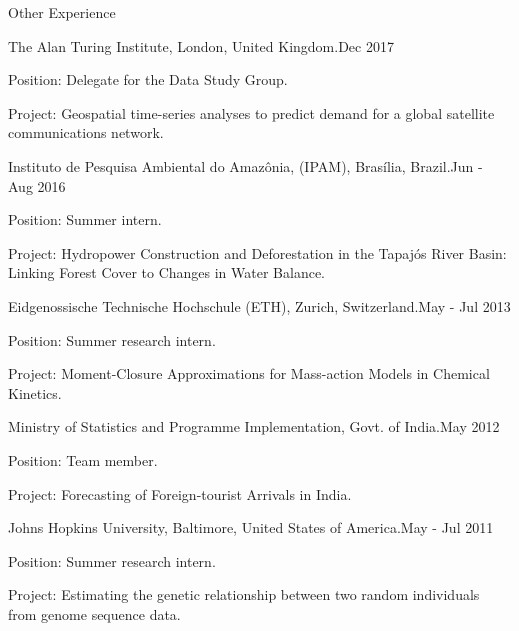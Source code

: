 \documentclass{resume} %
\begin{document}
\begin{rSection}{Other Experience}

\begin{rSubsection}{The Alan Turing Institute, London, United Kingdom.}{Dec 2017}{}{}
\item {Position}: Delegate for the Data Study Group. 
\item {Project}: Geospatial time-series analyses to predict demand for a global satellite communications network.
\end{rSubsection}

\begin{rSubsection}{Instituto de Pesquisa Ambiental do Amaz\^ onia, (IPAM), Bras\'{i}lia, Brazil.}{{Jun - Aug 2016}}{}{}
\item {Position}: Summer intern. 
\item {Project}: Hydropower Construction and Deforestation in the Tapaj\'{o}s River Basin: Linking Forest Cover to Changes in Water Balance.
\end{rSubsection}

\begin{rSubsection}{Eidgenossische Technische Hochschule (ETH), Zurich, Switzerland.}{{May - Jul 2013}}{}{}
\item {Position}: Summer research intern. 
\item {Project}: Moment-Closure Approximations for Mass-action Models in Chemical Kinetics.
\end{rSubsection}

\begin{rSubsection}{Ministry of Statistics and Programme Implementation, Govt. of India.}{{May 2012}}{}{}
\item {Position}: Team member. 
\item {Project}: Forecasting of Foreign-tourist Arrivals in India.
\end{rSubsection}

\begin{rSubsection}{Johns Hopkins University, Baltimore, United States of America.}{{May - Jul 2011}}{}{}  
\item {Position}: Summer research intern. 
\item {Project}: Estimating the genetic relationship between two random individuals from genome sequence data.
\end{rSubsection}

\end{rSection}
\end{document}
